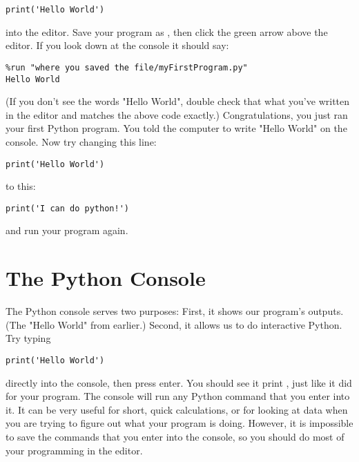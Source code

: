 \begin{Verbatim}
print('Hello World')
\end{Verbatim}

into the editor. Save your program as , then click the green
arrow above the editor. If you look down at the console it should say:

\begin{Verbatim}
%run "where you saved the file/myFirstProgram.py"
Hello World
\end{Verbatim}
(If you don't see the words "Hello World", double check that what you've written in the editor and matches the above code exactly.) Congratulations, you just ran your first Python program. You told the computer to write "Hello World" on the console.
Now try changing this line:
\begin{Verbatim}
print('Hello World')
\end{Verbatim}
to this:
\begin{Verbatim}
print('I can do python!')
\end{Verbatim}
and run your program again.
\section{The Python Console}
The Python console serves two purposes: First, it shows our program's outputs. (The "Hello World" from earlier.) Second, it allows us to do interactive Python. Try typing
\begin{Verbatim}
print('Hello World')
\end{Verbatim}
directly into the console, then press enter.  You should see it print
, just like it did for your program. The console
will run any Python command that you enter into it. It can be very
useful for short, quick calculations, or for looking at data when you
are trying to figure out what your program is doing. However, it is
impossible to save the commands that you enter into the console, so
you should do most of your programming in the editor.


